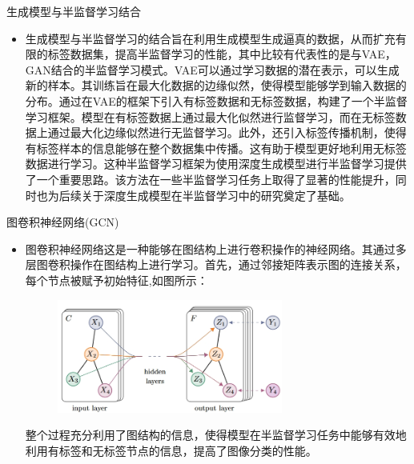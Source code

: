 \documentclass[UTF8]{beamer}
\begin{document}
\begin{frame}{生成模型与半监督学习结合}
    \scriptsize
    \begin{itemize}
        \item 生成模型与半监督学习的结合旨在利用生成模型生成逼真的数据，从而扩充有限的标签数据集，提高半监督学习的性能，其中比较有代表性的是与VAE，GAN结合的半监督学习模式。VAE可以通过学习数据的潜在表示，可以生成新的样本。其训练旨在最大化数据的边缘似然，使得模型能够学到输入数据的分布。通过在VAE的框架下引入有标签数据和无标签数据，构建了一个半监督学习框架。模型在有标签数据上通过最大化似然进行监督学习，而在无标签数据上通过最大化边缘似然进行无监督学习。此外，还引入标签传播机制，使得有标签样本的信息能够在整个数据集中传播。这有助于模型更好地利用无标签数据进行学习。这种半监督学习框架为使用深度生成模型进行半监督学习提供了一个重要思路。该方法在一些半监督学习任务上取得了显著的性能提升，同时也为后续关于深度生成模型在半监督学习中的研究奠定了基础。
    \end{itemize}
\end{frame}

\begin{frame}{图卷积神经网络(GCN)}
    \scriptsize
    \begin{itemize}
        \item 图卷积神经网络这是一种能够在图结构上进行卷积操作的神经网络。其通过多层图卷积操作在图结构上进行学习。首先，通过邻接矩阵表示图的连接关系，每个节点被赋予初始特征,如图所示：

        \begin{figure}[H]
            \centering
            \includegraphics[width=0.7\textwidth]{img//2-Image Recognition/3.jpg}
        \end{figure}

        整个过程充分利用了图结构的信息，使得模型在半监督学习任务中能够有效地利用有标签和无标签节点的信息，提高了图像分类的性能。
    \end{itemize}
\end{frame}
\end{document}
